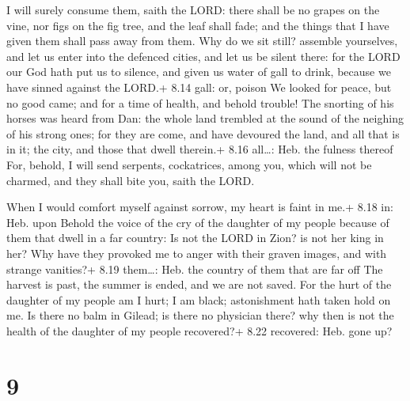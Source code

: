  I will surely consume them, saith the LORD: there shall
be no grapes on the vine, nor figs on the fig tree, and the leaf shall
fade; and the things that I have given them shall pass away from them.
 Why do we sit still? assemble yourselves, and let us enter
into the defenced cities, and let us be silent there: for the LORD our
God hath put us to silence, and given us water of gall to drink, because
we have sinned against the LORD.+ 8.14 gall: or, poison  We
looked for peace, but no good came; and for a time of health, and behold
trouble!  The snorting of his horses was heard from Dan:
the whole land trembled at the sound of the neighing of his strong ones;
for they are come, and have devoured the land, and all that is in it;
the city, and those that dwell therein.+ 8.16 all\ldots: Heb. the
fulness thereof  For, behold, I will send serpents,
cockatrices, among you, which will not be charmed, and they shall bite
you, saith the LORD.

 When I would comfort myself against sorrow, my heart is
faint in me.+ 8.18 in: Heb. upon  Behold the voice of the
cry of the daughter of my people because of them that dwell in a far
country: Is not the LORD in Zion? is not her king in her? Why have they
provoked me to anger with their graven images, and with strange
vanities?+ 8.19 them\ldots: Heb. the country of them that are far off
 The harvest is past, the summer is ended, and we are not
saved.  For the hurt of the daughter of my people am I
hurt; I am black; astonishment hath taken hold on me.  Is
there no balm in Gilead; is there no physician there? why then is not
the health of the daughter of my people recovered?+ 8.22 recovered: Heb.
gone up?

\hypertarget{section-8}{%
\section{9}\label{section-8}}

